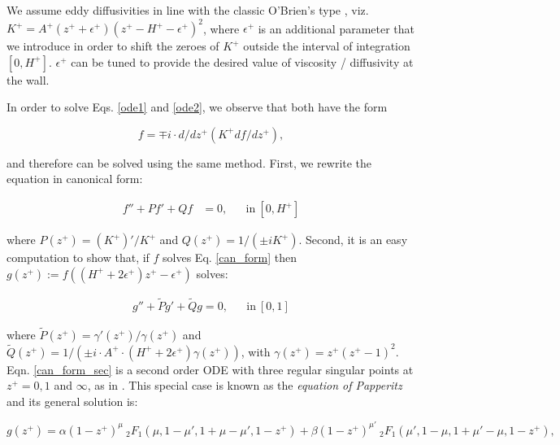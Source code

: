 We assume eddy diffusivities in line with the classic O'Brien's type \citep{O'Brien1970}, viz. $K^+ = A^+ (z^++\epsilon^+)(z^+-H^+-\epsilon^+)^2$, where
$\epsilon^+$ is an additional parameter that we introduce in order to shift the zeroes of $K^+$ outside the interval of integration $[0,H^+]$.
$\epsilon^+$ can be tuned to provide the desired value of viscosity / diffusivity at the wall. 

In order to solve Eqs. \ref{ode1} and \ref{ode2}, we observe that both have the form
%
\begin{linenomath*}
\begin{equation*}
	f= \mp i \cdot d/dz^+ ( K^+ df/dz^+ ),
\end{equation*}
\end{linenomath*}
%
and therefore can be solved using the same method. First, we rewrite the equation in canonical form:
%
\begin{linenomath*}
\begin{align}
	\label{can_form}
	f''+P f'+ Qf &=0, && \mathrm{in}  \ [0,H^+]
\end{align}
\end{linenomath*}
%
where $P(z^+)=(K^+)'/K^+$ and $Q(z^+)=1/(\pm i K^+)$. Second, it is an easy computation to show that, if $f$ solves Eq. \ref{can_form} then $g(z^+):=f( (H^++2 \epsilon^+) z^+- \epsilon^+)$ solves:
%
\begin{linenomath*}
\begin{align}
	\label{can_form_sec}
	g''+\widetilde{P} g'+ \widetilde{Q} g =0, && \mathrm{in}  \ [0,1]
\end{align}
\end{linenomath*}
%
where $\widetilde{P}(z^+)=\gamma'(z^+)/\gamma(z^+)$ and $\widetilde{Q}(z^+)=1/(\pm i \cdot A^+ \cdot (H^++2\epsilon^+) \gamma(z^+))$, with $\gamma(z^+)=z^+(z^+-1)^2$.
Eqn. \ref{can_form_sec} is a second order ODE with three regular singular points at $z^+ = 0,1$ and $\infty$, as in \citet{Morse1954a}. 
This special case is known as the \emph{equation of Papperitz} and its general solution is:
%
\begin{linenomath*}
\begin{equation}
	g(z^+) = \alpha (1-z^+)^\mu \ _2F_1 (\mu, 1- \mu', 1+\mu-\mu', 1-z^+)
	+\beta (1-z^+)^{\mu'} \ _2F_1 (\mu', 1- \mu, 1+\mu'-\mu, 1-z^+),
	\label{gen_sol_g}
\end{equation}
\end{linenomath*}
%

